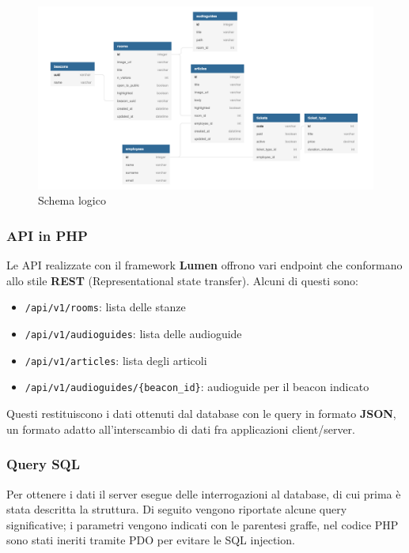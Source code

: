 \documentclass[12pt]{article}
\begin{document}
\begin{center}
    \begin{figure}[htp]
        \centering
        \includegraphics[width=\textwidth]{diagrams/logic_scheme.png}
        \caption{Schema logico}
        \label{fig:logic_scheme}
    \end{figure}
\end{center}

\subsubsection{API in PHP}
Le API realizzate con il framework \textbf{Lumen} offrono vari endpoint che conformano allo stile \textbf{REST} (Representational state transfer). Alcuni di questi sono:
\begin{itemize}
    \item \verb+/api/v1/rooms+: lista delle stanze
    \item \verb+/api/v1/audioguides+: lista delle audioguide
    \item \verb+/api/v1/articles+: lista degli articoli
    \item \verb+/api/v1/audioguides/{beacon_id}+: audioguide per il beacon indicato
\end{itemize}
Questi restituiscono i dati ottenuti dal database con le query in formato \textbf{JSON}, un formato adatto all'interscambio di dati fra applicazioni client/server.
\subsubsection{Query SQL}
Per ottenere i dati il server esegue delle interrogazioni al database, di cui prima è stata descritta la struttura. Di seguito vengono riportate alcune query significative; i parametri vengono indicati con le parentesi graffe, nel codice PHP sono stati ineriti tramite PDO per evitare le SQL injection.\\\\
\end{document}
